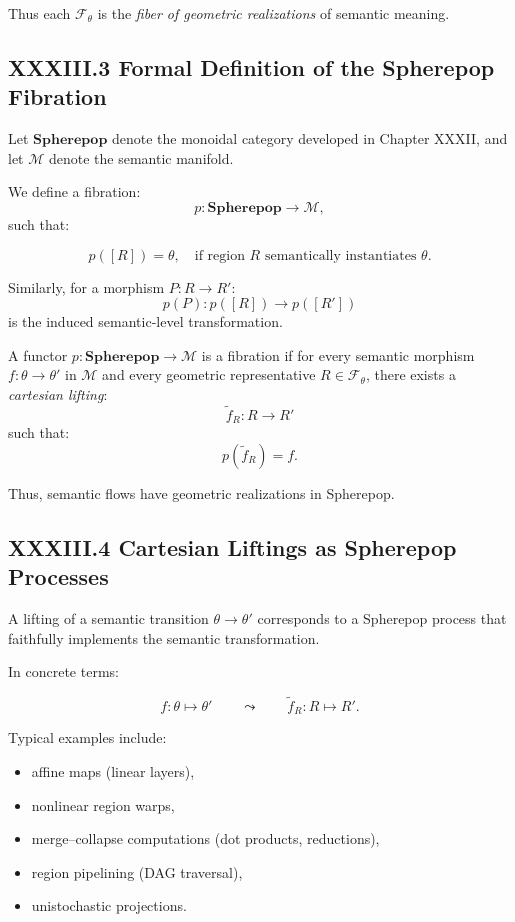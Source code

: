 \documentclass[12pt,letterpaper]{article}
\begin{document}
Thus each $\mathcal{F}_\theta$ is the \emph{fiber of geometric realizations} of semantic meaning.

\subsection{XXXIII.3 Formal Definition of the Spherepop Fibration}

Let $\mathbf{Spherepop}$ denote the monoidal category developed in Chapter XXXII, and let $\mathcal{M}$ denote the semantic manifold.

We define a fibration:
\[
p : \mathbf{Spherepop} \to \mathcal{M},
\]
such that:

\[
p([R]) = \theta, \quad \text{if region } R \text{ semantically instantiates } \theta.
\]

Similarly, for a morphism $P : R \to R'$:
\[
p(P) : p([R]) \to p([R'])
\]
is the induced semantic-level transformation.

\begin{definition}
A functor $p : \mathbf{Spherepop} \to \mathcal{M}$ is a fibration if for every semantic morphism $f : \theta \to \theta'$ in $\mathcal{M}$ and every geometric representative $R \in \mathcal{F}_\theta$, there exists a \emph{cartesian lifting}:
\[
\widetilde{f}_R : R \to R'
\]
such that:
\[
p(\widetilde{f}_R) = f.
\]
\end{definition}

Thus, semantic flows have geometric realizations in Spherepop.

\subsection{XXXIII.4 Cartesian Liftings as Spherepop Processes}

A lifting of a semantic transition $\theta \to \theta'$ corresponds to a Spherepop process that faithfully implements the semantic transformation.

In concrete terms:

\[
f : \theta \mapsto \theta' \qquad\leadsto\qquad
\widetilde{f}_R : R \mapsto R'.
\]

Typical examples include:

\begin{itemize}
    \item affine maps (linear layers),
    \item nonlinear region warps,
    \item merge--collapse computations (dot products, reductions),
    \item region pipelining (DAG traversal),
    \item unistochastic projections.
\end{itemize}
\end{document}
